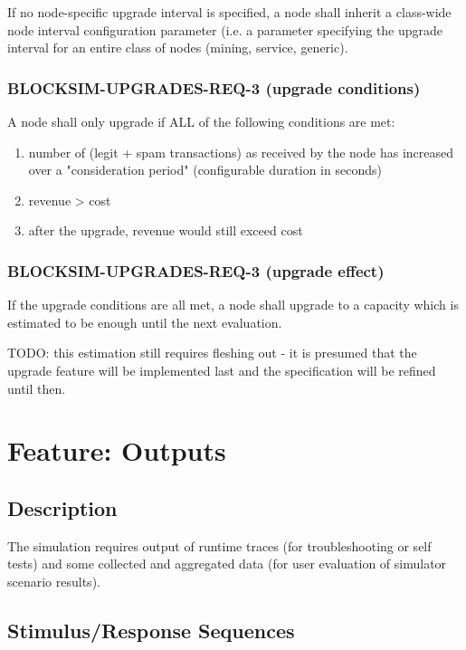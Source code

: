 \documentclass{scrreprt}
\begin{document}
If no node-specific upgrade interval is specified, a node shall inherit
a class-wide node interval configuration parameter (i.e. a parameter
specifying the upgrade interval for an entire class of nodes (mining,
service, generic).

\subsubsection{BLOCKSIM-UPGRADES-REQ-3 (upgrade conditions)}

A node shall only upgrade if ALL of the following conditions are met:

\begin{enumerate}
   \item number of (legit + spam transactions) as received by the node has increased
over a "consideration period" (configurable duration in seconds)

   \item revenue > cost

   \item after the upgrade, revenue would still exceed cost
\end{enumerate}


\subsubsection{BLOCKSIM-UPGRADES-REQ-3 (upgrade effect)}
If the upgrade conditions are all met, a node shall upgrade to a capacity
which is estimated to be enough until the next evaluation.

TODO: this estimation still requires fleshing out - it is presumed that
the upgrade feature will be implemented last and the specification will
be refined until then.



\section{Feature: Outputs}

\subsection{Description}

The simulation requires output of runtime traces (for troubleshooting or
self tests) and some collected and aggregated data (for user evaluation of
simulator scenario results).


\subsection{Stimulus/Response Sequences}
\end{document}
